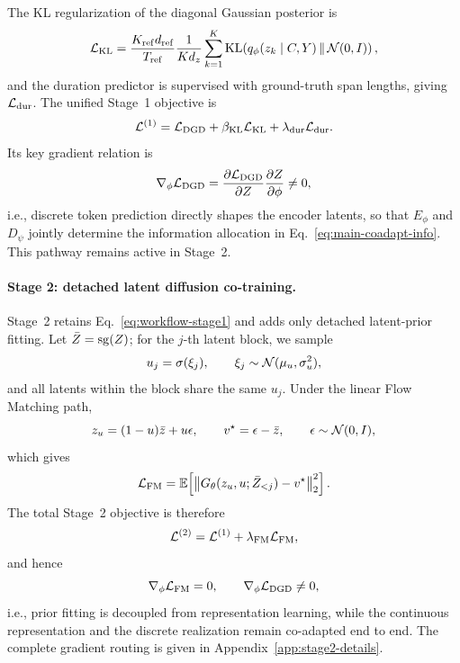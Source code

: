 The KL regularization of the diagonal Gaussian posterior is
\begin{equation}
    \mathcal{L}_{\mathrm{KL}}
    =\frac{K_{\mathrm{ref}}d_{\mathrm{ref}}}{T_{\mathrm{ref}}}
    \frac{1}{Kd_z}\sum_{k=1}^{K}
    \operatorname{KL}\!\left(q_\phi(z_k\mid C,Y)\,\|\,\mathcal{N}(0,I)\right),
    \label{eq:workflow-kl}
\end{equation}
and the duration predictor is supervised with ground-truth span lengths, giving $\mathcal{L}_{\mathrm{dur}}$. The unified Stage~1 objective is
\begin{equation}
    \mathcal{L}^{(1)}
    =\mathcal{L}_{\mathrm{DGD}}
    +\beta_{\mathrm{KL}}\mathcal{L}_{\mathrm{KL}}
    +\lambda_{\mathrm{dur}}\mathcal{L}_{\mathrm{dur}}.
    \label{eq:workflow-stage1}
\end{equation}
Its key gradient relation is
\begin{equation}
    \nabla_\phi\mathcal{L}_{\mathrm{DGD}}
    =\frac{\partial\mathcal{L}_{\mathrm{DGD}}}{\partial Z}
     \frac{\partial Z}{\partial\phi}
    \neq0,
    \label{eq:workflow-dec-to-enc-grad}
\end{equation}
i.e., discrete token prediction directly shapes the encoder latents, so that $E_\phi$ and $D_\psi$ jointly determine the information allocation in Eq.~\eqref{eq:main-coadapt-info}. This pathway remains active in Stage~2.

\paragraph{Stage 2: detached latent diffusion co-training.}
Stage~2 retains Eq.~\eqref{eq:workflow-stage1} and adds only detached latent-prior fitting. Let $\bar Z=\operatorname{sg}(Z)$; for the $j$-th latent block, we sample
\begin{equation}
    u_j=\sigma(\xi_j),
    \qquad
    \xi_j\sim\mathcal{N}(\mu_u,\sigma_u^2),
    \label{eq:workflow-logitnormal}
\end{equation}
and all latents within the block share the same $u_j$. Under the linear Flow Matching path,
\begin{equation}
    z_u=(1-u)\bar z+u\epsilon,
    \qquad
    v^\star=\epsilon-\bar z,
    \qquad
    \epsilon\sim\mathcal{N}(0,I),
    \label{eq:workflow-flow}
\end{equation}
which gives
\begin{equation}
    \mathcal{L}_{\mathrm{FM}}
    =\mathbb{E}\!\left[\left\|G_\theta(z_u,u;\bar Z_{<j})-v^\star\right\|_2^2\right].
    \label{eq:workflow-fm}
\end{equation}
The total Stage~2 objective is therefore
\begin{equation}
    \mathcal{L}^{(2)}
    =\mathcal{L}^{(1)}+\lambda_{\mathrm{FM}}\mathcal{L}_{\mathrm{FM}},
    \label{eq:workflow-stage2}
\end{equation}
and hence
\begin{equation}
    \nabla_\phi\mathcal{L}_{\mathrm{FM}}=0,
    \qquad
    \nabla_\phi\mathcal{L}_{\mathrm{DGD}}\neq0,
    \label{eq:workflow-gradient-routing}
\end{equation}
i.e., prior fitting is decoupled from representation learning, while the continuous representation and the discrete realization remain co-adapted end to end. The complete gradient routing is given in Appendix~\ref{app:stage2-details}.


